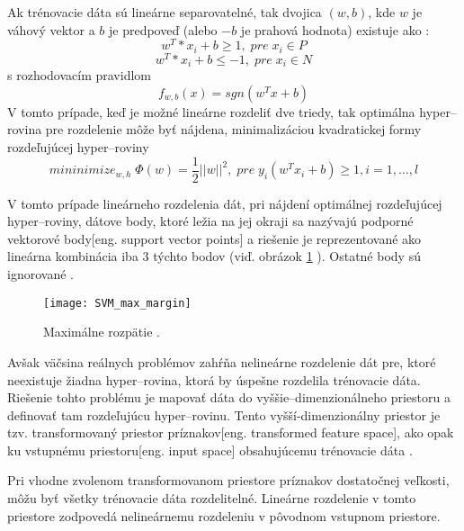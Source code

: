 Ak trénovacie dáta sú lineárne separovatelné, tak dvojica $(w, b)$, kde $w$ je váhový vektor a $b$ je predpoveď
    (alebo $-b$ je prahová hodnota) existuje ako \cite{prop:SupervisedMachineLearning}:
\begin{equation}
    \label{eq:SVMPair1}
    w^T * x_i + b \geq 1, \; pre \; x_i \in P
\end{equation}
\begin{equation}
    \label{eq:SVMPair2}
    w^T * x_i + b \leq -1, \; pre \; x_i \in N
\end{equation}
s rozhodovacím pravidlom
\begin{equation}
    \label{eq:SVMDecisionRule}
    f_{w,b}(x) = sgn(w^T x + b)
\end{equation}
V tomto prípade, keď je možné lineárne rozdeliť dve triedy, tak optimálna hyper--rovina pre rozdelenie
    môže byť nájdena, minimalizáciou kvadratickej formy rozdeľujúcej hyper--roviny
\begin{equation}
    \label{eq:SVMDecisionRule}
    mininimize_{w,h} \; \Phi(w) = \frac{1}{2}||w||^2, \; pre \; y_i(w^Tx_i + b) \geq 1, i = 1, \dots, l
\end{equation}

V tomto prípade lineárneho rozdelenia dát, pri nájdení optimálnej rozdeľujúcej hyper--roviny, dátove body, ktoré ležia na jej okraji
    sa nazývajú podporné vektorové body[eng. support vector points] a riešenie je reprezentované ako lineárna kombinácia iba 3 týchto bodov (viď. obrázok \ref{pic:SVMMAxMargin} ).
Ostatné body sú ignorované \cite{prop:SupervisedMachineLearning}.

\begin{figure}[H]
	\centering
	\texttt{[image: SVM\_max\_margin]}
	\caption{Maximálne rozpätie \cite{prop:SupervisedMachineLearning}.}
	\label{pic:SVMMAxMargin}
\end{figure}

Avšak väčsina reálnych problémov zahŕňa nelineárne rozdelenie dát pre, ktoré neexistuje žiadna hyper--rovina, ktorá by úspešne rozdelila trénovacie dáta.
Riešenie tohto problému je mapovať dáta do vyššie--dimenzionálneho priestoru a definovať tam rozdeľujúcu hyper--rovinu.
Tento vyšší-dimenzionálny priestor je tzv. transformovaný priestor príznakov[eng. transformed feature space], ako opak ku vstupnému priestoru[eng. input space] obsahujúcemu trénovacie dáta \cite{prop:SupervisedMachineLearning}.

Pri vhodne zvolenom transformovanom priestore príznakov dostatočnej veľkosti, môžu byť všetky trénovacie dáta rozdelitelné.
Lineárne rozdelenie v tomto priestore zodpovedá nelineárnemu rozdeleniu v pôvodnom vstupnom priestore.

